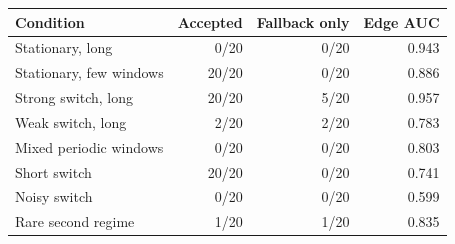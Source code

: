 \begin{tabular}{lrrr}
\toprule
Condition & Accepted & Fallback only & Edge AUC \\
\midrule
Stationary, long & 0/20 & 0/20 & 0.943 \\
Stationary, few windows & 20/20 & 0/20 & 0.886 \\
Strong switch, long & 20/20 & 5/20 & 0.957 \\
Weak switch, long & 2/20 & 2/20 & 0.783 \\
Mixed periodic windows & 0/20 & 0/20 & 0.803 \\
Short switch & 20/20 & 0/20 & 0.741 \\
Noisy switch & 0/20 & 0/20 & 0.599 \\
Rare second regime & 1/20 & 1/20 & 0.835 \\
\bottomrule
\end{tabular}

